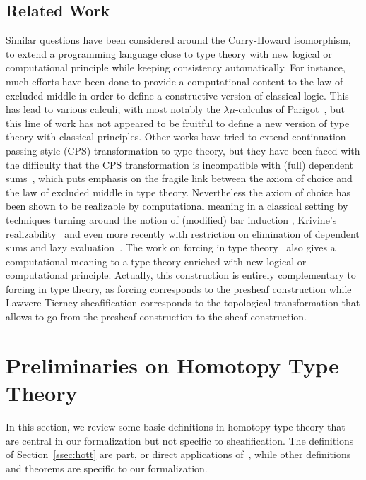 \documentclass[notfinal]{jfrarticle}
\begin{document}
\subsection*{Related Work}

Similar questions have been considered around the Curry-Howard
isomorphism, to extend a programming language close to type theory
with new logical or computational principle while keeping consistency
automatically.
%
For instance, much efforts have been done to provide a computational
content to the law of excluded middle in order to define a
constructive version of classical logic. This has lead to various
calculi, with most notably the $\lambda \mu$-calculus of
Parigot~\cite{parigot1993classical}, but this line of work has not
appeared to be fruitful to define a new version of type theory with
classical principles.
%
Other works have tried to extend continuation-passing-style (CPS)
transformation to type theory, but they have been faced with the
difficulty that the CPS transformation is incompatible with (full) dependent
sums~\cite{barthe2002cps}, which puts emphasis on the fragile link
between the axiom of choice and the law of excluded middle in type theory.
%
Nevertheless the axiom of choice has been shown to be realizable by
computational meaning in a classical setting by techniques turning
around the notion of (modified) bar induction
\cite{berardi1998computational}, Krivine's
realizability~\cite{krivine2003dependent} and even more recently with
restriction on elimination of dependent sums and lazy
evaluation~\cite{herbelin2012constructive}.
The work on forcing in type theory~\cite{jaber2012extending,forcing2016} also
gives a computational meaning to a type theory enriched with new
logical or computational principle.
%
Actually, this construction is entirely complementary to
forcing in type theory, as forcing corresponds to the presheaf
construction while Lawvere-Tierney sheafification corresponds to the
topological transformation that allows to go from the presheaf
construction to the sheaf construction.




\section{Preliminaries on Homotopy Type Theory}
\label{sec:hott}

In this section, we review some basic definitions in homotopy type
theory that are central in our formalization but not specific to
sheafification. 
The definitions of Section~\ref{ssec:hott} 
are part, or direct applications of~\cite{hottbook}, while other definitions
and theorems are specific to our formalization. 
\end{document}
